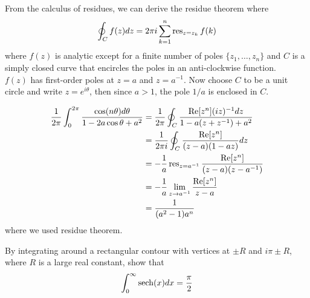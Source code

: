 \documentclass[a4paper]{article}
\begin{document}
\begin{ans}
From the calculus of residues, we can derive the residue theorem where 
$$\oint_Cf(z)dz=2\pi i\sum_{k=1}^n\operatorname{res}_{z=z_k}f(k)$$
where $f(z)$ is analytic except for a finite number of poles $\{z_1,\dots,z_n\}$ and $C$ is a simply closed curve that encircles the poles in an anti-clockwise function.\\[5pt]
$f(z)$ has first-order poles at $z=a$ and $z=a^{-1}$. Now choose $C$ to be a unit circle and write $z=e^{i\theta}$, then since $a>1$, the pole $1/a$ is enclosed in $C$.
 \begin{center}
  \end{center}
\begin{align}
\frac{1}{2\pi}\int_0^{2\pi}\frac{\cos(n\theta)d\theta}{1-2a\cos\theta+a^2}&=\frac{1}{2\pi}\oint_C\frac{\text{Re}[z^n](iz)^{-1}dz}{1-a(z+z^{-1})+a^2}\nonumber\\&=\frac{1}{2\pi i}\oint_C\frac{\text{Re}[z^n]}{(z-a)(1-az)}dz\nonumber\\&=-\frac{1}{a}\operatorname{res}_{z=a^{-1}}\frac{\text{Re}[z^n]}{(z-a)(z-a^{-1})}\nonumber\\&=-\frac{1}{a}\lim_{z\rightarrow a^{-1}}\frac{\text{Re}[z^n]}{z-a}\nonumber\\&=\frac{1}{(a^2-1)a^n}\nonumber
\end{align}
where we used residue theorem.
\end{ans}
\newpage
\begin{qns}
By integrating around a rectangular contour with vertices at $\pm R$ and $i\pi\pm R$, where $R$ is a large real constant, show that
$$\int_0^\infty\operatorname{sech}(x)dx=\frac{\pi}{2}$$
\end{qns}
\end{document}
